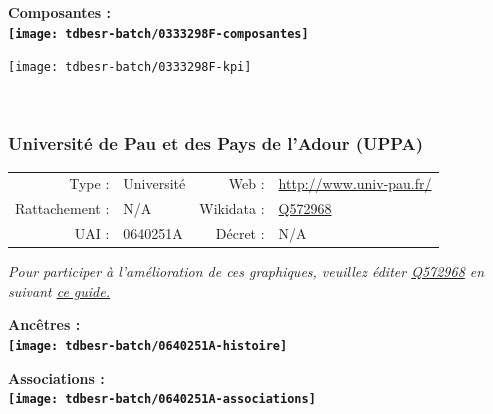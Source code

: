 \documentclass[12pt,french,]{article}
\begin{document}
\hrulefill

\begin{center} \bf Composantes : \\  
\texttt{[image: tdbesr-batch/0333298F-composantes]} \end{center}

\begin{center}\texttt{[image: tdbesr-batch/0333298F-kpi]} \end{center}\checkoddpage

\ifoddpage \fi ~\newpage  

\hypertarget{universituxe9-de-pau-et-des-pays-de-ladour-uppa}{%
\subsubsection{Université de Pau et des Pays de l'Adour
(UPPA)}\label{universituxe9-de-pau-et-des-pays-de-ladour-uppa}}

\begin{tabular*}{\textwidth}{rp{5cm}rl}  
\hline  
Type : & Université & Web : &\href{http://www.univ-pau.fr/}{http://www.univ-pau.fr/} \\  
Rattachement : & N/A & Wikidata : & \href{https://www.wikidata.org/entity/Q572968}{Q572968} \\  
UAI : & 0640251A & Décret : & N/A \\  
\hline  
\end{tabular*}

\textit{\scriptsize Pour participer à l'amélioration de ces graphiques, veuillez éditer  \href{https://www.wikidata.org/entity/Q572968}{Q572968}  en suivant \href{https://github.com/cpesr/wikidataESR/blob/master/Rmd/wikidataESR.md}{ce guide.}}

\vspace{1cm}  
\begin{minipage}[b]{0.50\textwidth}\begin{center} \bf Ancêtres : \\  
\texttt{[image: tdbesr-batch/0640251A-histoire]} \end{center}\end{minipage}\begin{minipage}[b]{0.50\textwidth}\begin{center} \bf Associations : \\  
\texttt{[image: tdbesr-batch/0640251A-associations]} \end{center}\end{minipage}

\hrulefill
\end{document}
